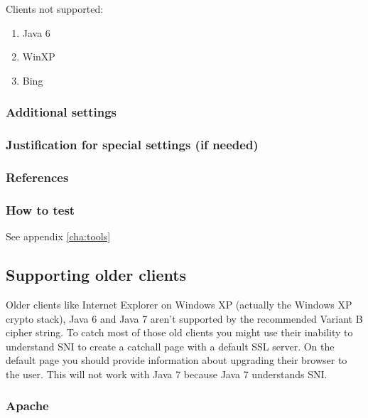 Clients not supported:
\begin{enumerate}
  \item Java 6
  \item WinXP
  \item Bing
\end{enumerate}


\subsubsection{Additional settings}


\subsubsection{Justification for special settings (if needed)}


\subsubsection{References}



\subsubsection{How to test}
See appendix \ref{cha:tools}

\subsection{Supporting older clients}

Older clients like Internet Explorer on Windows XP (actually the Windows XP
crypto stack), Java 6 and Java 7 aren't supported by the recommended Variant B
cipher string.
To catch most of those old clients you might use their inability to understand
SNI to create a catchall page with a default SSL server. On the default page
you should provide information about upgrading their browser to the user.
This will not work with Java 7 because Java 7 understands SNI.

\subsubsection{Apache}

